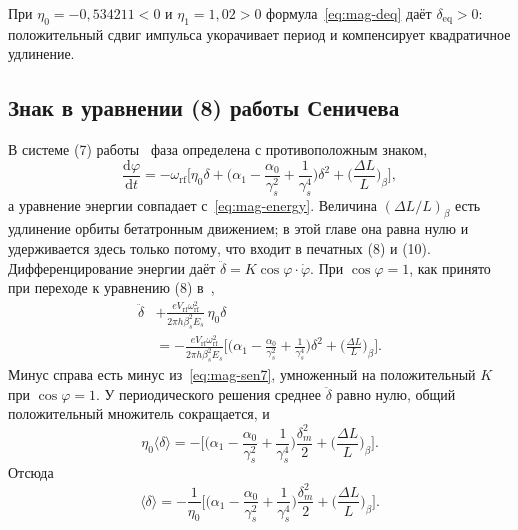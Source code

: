 При $\eta_0=-0{,}534211<0$ и $\eta_1=1{,}02>0$ формула~\eqref{eq:mag-deq} даёт $\delta_{\mathrm{eq}}>0$: положительный сдвиг импульса укорачивает период и компенсирует квадратичное удлинение.

\subsection{Знак в уравнении (8) работы Сеничева}
\label{sec:sign}

В системе (7) работы~\cite{Senichev2013} фаза определена с противоположным знаком,
\begin{equation}
\label{eq:mag-sen7}
\frac{\mathrm{d}\varphi}{\mathrm{d}t}
=-\omega_{\mathrm{rf}}
\Biggl[
\eta_0\delta
+\Biggl(\alpha_1-\frac{\alpha_0}{\gamma_s^2}+\frac{1}{\gamma_s^4}\Biggr)\delta^2
+\Biggl(\frac{\Delta L}{L}\Biggr)_{\!\beta}
\Biggr],
\end{equation}
а уравнение энергии совпадает с~\eqref{eq:mag-energy}. Величина $(\Delta L/L)_\beta$ есть удлинение орбиты бетатронным движением; в этой главе она равна нулю и удерживается здесь только потому, что входит в печатных (8) и (10). Дифференцирование энергии даёт $\ddot\delta=K\cos\varphi\cdot\dot\varphi$. При $\cos\varphi=1$, как принято при переходе к уравнению (8) в~\cite{Senichev2013},
\begin{equation}
\label{eq:mag-sen8}
\begin{aligned}
\ddot\delta
&+\frac{eV_{\mathrm{rf}}\omega_{\mathrm{rf}}^2}{2\pi h\beta_s^2 E_s}\,\eta_0\delta
\\
&=
-\frac{eV_{\mathrm{rf}}\omega_{\mathrm{rf}}^2}{2\pi h\beta_s^2 E_s}
\Biggl[
\Biggl(\alpha_1-\frac{\alpha_0}{\gamma_s^2}+\frac{1}{\gamma_s^4}\Biggr)\delta^2
+\Biggl(\frac{\Delta L}{L}\Biggr)_{\!\beta}
\Biggr].
\end{aligned}
\end{equation}
Минус справа есть минус из~\eqref{eq:mag-sen7}, умноженный на положительный $K$ при $\cos\varphi=1$. У периодического решения среднее $\ddot\delta$ равно нулю, общий положительный множитель сокращается, и
\begin{equation}
\label{eq:mag-sen8-avg}
\eta_0\langle\delta\rangle
=
-\Biggl[
\Biggl(\alpha_1-\frac{\alpha_0}{\gamma_s^2}+\frac{1}{\gamma_s^4}\Biggr)
\frac{\delta_m^2}{2}
+\Biggl(\frac{\Delta L}{L}\Biggr)_{\!\beta}
\Biggr].
\end{equation}
Отсюда
\begin{equation}
\label{eq:mag-sen8-deq}
\langle\delta\rangle
=
-\frac{1}{\eta_0}
\Biggl[
\Biggl(\alpha_1-\frac{\alpha_0}{\gamma_s^2}+\frac{1}{\gamma_s^4}\Biggr)
\frac{\delta_m^2}{2}
+\Biggl(\frac{\Delta L}{L}\Biggr)_{\!\beta}
\Biggr].
\end{equation}
